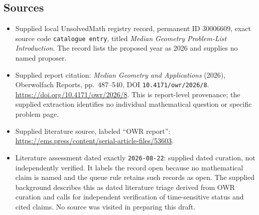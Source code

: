 \documentclass[11pt]{article}
\begin{document}
\subsection{Sources}
\begin{itemize}
\item Supplied local UnsolvedMath registry record, permanent ID \(30006609\), exact source code \texttt{catalogue entry}, titled \emph{Median Geometry Problem-List Introduction}. The record lists the proposed year as 2026 and supplies no named proposer.
\item Supplied report citation: \emph{Median Geometry and Applications} (2026), Oberwolfach Reports, pp.\ 487--540, DOI \texttt{10.4171/owr/2026/8}. \url{https://doi.org/10.4171/owr/2026/8}. This is report-level provenance; the supplied extraction identifies no individual mathematical question or specific problem page.
\item Supplied literature source, labeled ``OWR report'': \url{https://ems.press/content/serial-article-files/53603}.
\item Literature assessment dated exactly \texttt{2026-08-22}: supplied dated curation, not independently verified. It labels the record open because no mathematical claim is named and the queue rule retains such records as open. The supplied background describes this as dated literature triage derived from OWR curation and calls for independent verification of time-sensitive status and cited claims. No source was visited in preparing this draft.
\end{itemize}
\end{document}

